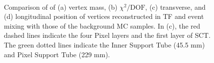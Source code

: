 \begin{figure}[!htb]
    \centering
     \\
    \caption{Comparison of of (a) vertex mass, (b) $\chi^{2} / \mathrm{DOF}$, (c) transverse, and (d) longitudinal position of \xx vertices reconstructed in TF and event mixing with those of the background MC samples. In (c), the red dashed lines indicate the four Pixel layers and the first layer of SCT. The green dotted lines indicate the Inner Support Tube (45.5 mm) and Pixel Support Tube (229 mm).}
    \label{fig:random-crossing_vertex_dist}
\end{figure}


